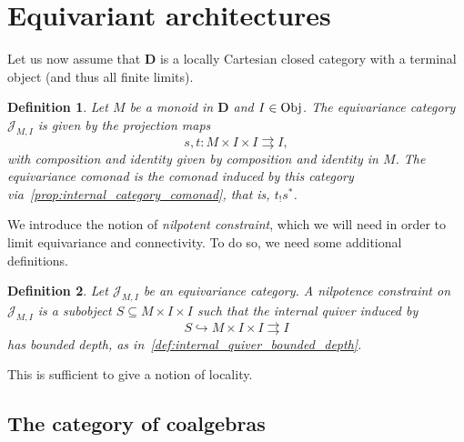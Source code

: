 \documentclass[12pt]{article}
\newtheorem{definition}{Definition}
\newcommand{\Obj}{{\textnormal{Obj}}}
\newcommand{\Cat}{{\mathbf{C}}}
\newcommand{\DCat}{{\mathbf{D}}}
\newcommand{\JCat}{{\mathcal{J}}}
\begin{document}
\section{Equivariant architectures}

Let us now assume that $\DCat$  is a locally Cartesian closed category with a terminal object (and thus all finite limits).

\begin{definition}\label{def:equivariance_category}
    Let $M$ be a monoid in $\DCat$ and $I \in \Obj$. The {\em equivariance category} $\JCat_{M, I}$ is given by the projection maps
    \begin{equation*}
        s, t\colon M \times I \times I \rightrightarrows I,
    \end{equation*}
    with composition and identity given by composition and identity in $M$. The {\em equivariance comonad} is the comonad induced by this category via~\cref{prop:internal_category_comonad}, that is, $t_!s^*$.
\end{definition}

We introduce the notion of {\em nilpotent constraint}, which we will need in order to limit equivariance and connectivity. To do so, we need some additional definitions.

\begin{definition}\label{def:nilpotent_architecture}
    Let $\JCat_{M, I}$ be an equivariance category. A {\em nilpotence constraint} on $\JCat_{M, I}$ is a subobject $S \subseteq M \times I \times I$ such that the internal quiver induced by
    \begin{equation*}
        S \hookrightarrow M \times I \times I \rightrightarrows I
    \end{equation*}
    has bounded depth, as in~\cref{def:internal_quiver_bounded_depth}.
\end{definition}

This is sufficient to give a notion of locality.



\subsection{The category of coalgebras}
\end{document}

